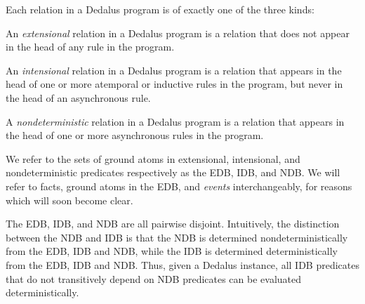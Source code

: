 
Each relation in a Dedalus program is of exactly one of the three kinds:


%
%

\begin{definition}
%
An \emph{extensional} relation in a Dedalus program is a relation that does not
appear in the head of any rule in the program.
%
\end{definition}

 \begin{definition}
 An \emph{intensional} relation in a Dedalus program is a relation that appears
 in the head of one or more atemporal or inductive rules in the program, but never in the head of an asynchronous rule.
 \end{definition}

 \begin{definition}
 A \emph{nondeterministic} relation in a Dedalus program is a relation that appears in
 the head of one or more asynchronous rules in the program.
 \end{definition}

 We refer to the sets of ground atoms in extensional, intensional, and nondeterministic
 predicates respectively as the EDB, IDB, and NDB.  We will refer to facts, ground atoms
 in the EDB, and \emph{events} interchangeably, for reasons which will soon become clear.

 The EDB, IDB, and NDB are all pairwise disjoint.  Intuitively, the distinction
 between the NDB and IDB is that the NDB is determined nondeterministically from
 the EDB, IDB and NDB, while the IDB is determined deterministically from the
 EDB, IDB and NDB.  Thus, given a Dedalus instance, all IDB
 predicates that do not transitively depend on NDB predicates can be evaluated
 deterministically.  


